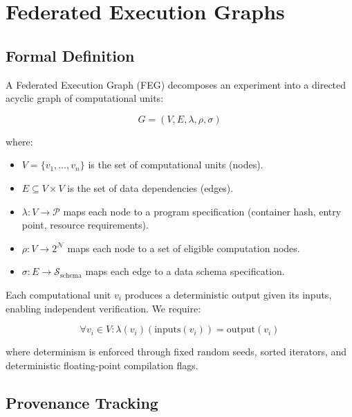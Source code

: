 \documentclass[11pt,a4paper]{article}
\begin{document}
\section{Federated Execution Graphs}
\label{sec:execution}

\subsection{Formal Definition}

A Federated Execution Graph (FEG) decomposes an experiment into a directed acyclic graph of computational units:

\begin{equation}
    G = (V, E, \lambda, \rho, \sigma)
\end{equation}

\noindent where:
\begin{itemize}[leftmargin=*]
    \item $V = \{v_1, \ldots, v_n\}$ is the set of computational units (nodes).
    \item $E \subseteq V \times V$ is the set of data dependencies (edges).
    \item $\lambda: V \rightarrow \mathcal{P}$ maps each node to a program specification (container hash, entry point, resource requirements).
    \item $\rho: V \rightarrow 2^{\mathcal{N}}$ maps each node to a set of eligible computation nodes.
    \item $\sigma: E \rightarrow \mathcal{S}_{\text{schema}}$ maps each edge to a data schema specification.
\end{itemize}

Each computational unit $v_i$ produces a deterministic output given its inputs, enabling independent verification.
We require:

\begin{equation}
    \forall v_i \in V: \lambda(v_i)(\text{inputs}(v_i)) = \text{output}(v_i)
\end{equation}

\noindent where determinism is enforced through fixed random seeds, sorted iterators, and deterministic floating-point compilation flags.

\subsection{Provenance Tracking}
\end{document}
